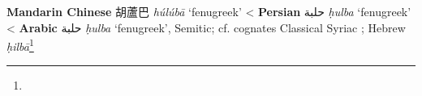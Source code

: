 \begin{etymology}\label{ety:huluba}
\textbf{Mandarin Chinese} {胡蘆巴} \textit{húlúbā} `fenugreek'
< \textbf{Persian} {حلبة} \textit{ḥulba} `fenugreek'
< \textbf{Arabic} {حلبة} \textit{ḥulba} `fenugreek', Semitic; cf. cognates Classical Syriac ; Hebrew  \textit{ḥilbā}\footnote{}
\end{etymology}